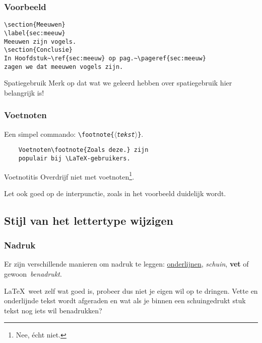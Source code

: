 \begin{frame}[fragile]
  \frametitle{Voorbeeld}
  \begin{verbatim}
\section{Meeuwen}
\label{sec:meeuw}
Meeuwen zijn vogels.
\section{Conclusie}
In Hoofdstuk~\ref{sec:meeuw} op pag.~\pageref{sec:meeuw}
zagen we dat meeuwen vogels zijn.
\end{verbatim}

  \begin{exampleblock}{Spatiegebruik}
	Merk op dat wat we geleerd hebben over spatiegebruik hier belangrijk is!
  \end{exampleblock}
\end{frame}

\begin{frame}[fragile]
  \frametitle{Voetnoten}

  Een simpel commando: \texttt{\textcolor{uagreen}{\textbackslash footnote}\{$\langle$\textsl{tekst}$\rangle$\}}.
  \begin{verbatim}
	Voetnoten\footnote{Zoals deze.} zijn
	populair bij \LaTeX-gebruikers.
  \end{verbatim}

  \begin{exampleblock}{Voetnotitis}
	  Overdrijf niet met voetnoten\footnote{Nee, \'echt niet.}.
  \end{exampleblock}

  Let ook goed op de interpunctie, zoals in het voorbeeld duidelijk wordt.
\end{frame}

\subsection{Stijl van het lettertype wijzigen}
\begin{frame}
  \frametitle{Nadruk}

  Er zijn verschillende manieren om nadruk te leggen: \underline{onderlijnen}, \textsl{schuin}, \textbf{vet} of gewoon~\emph{benadrukt}.

  \LaTeX\ weet zelf wat goed is, probeer dus niet je eigen wil op te dringen. Vette en onderlijnde tekst wordt afgeraden en wat als je binnen een schuingedrukt stuk tekst nog iets wil benadrukken?
\end{frame}

